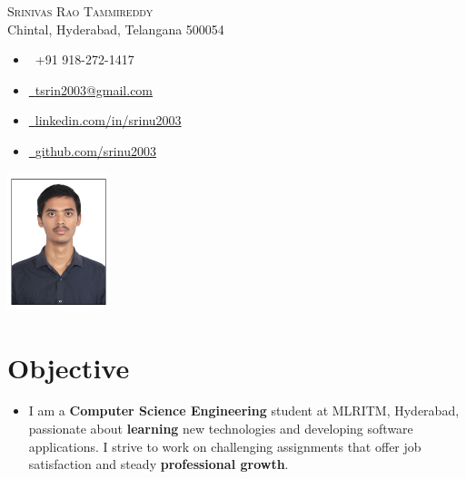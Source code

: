 \documentclass[a4paper,11pt]{article}
\begin{document}

\begin{center}
    \begin{minipage}{0.7\textwidth}
        \raggedright
        {\Huge \scshape Srinivas Rao Tammireddy} \\ \vspace{6pt}
        Chintal, Hyderabad, Telangana 500054 \\ \vspace{1pt}
        \small
        \begin{itemize}[leftmargin=0.15in, label={}]
            \item \faPhone\ +91 918-272-1417 
            \item \href{mailto:tsrin2003@gmail.com}{\faEnvelope\  {tsrin2003@gmail.com}}
            \item \href{https://linkedin.com/in/srinu2003/}{\faLinkedin\ {linkedin.com/in/srinu2003}}
            \item \href{https://github.com/srinu2003}{\faGithub\ {github.com/srinu2003}}
        \end{itemize}
    \end{minipage}%
    \begin{minipage}{0.3\textwidth}
        \includegraphics[width=3cm, center]{passport-size-photo.jpg}
    \end{minipage}
\end{center}


\section{Objective} 
  \begin{itemize}[leftmargin=0.15in, label={}]
    \item \fontsize{10}{12} {\selectfont
    I am a \textbf{Computer Science Engineering} student at MLRITM, Hyderabad, passionate about \textbf{learning} new technologies and developing software applications. I strive to work on challenging assignments that offer job satisfaction and steady \textbf{professional growth}.}
  \end{itemize}
\end{document}
